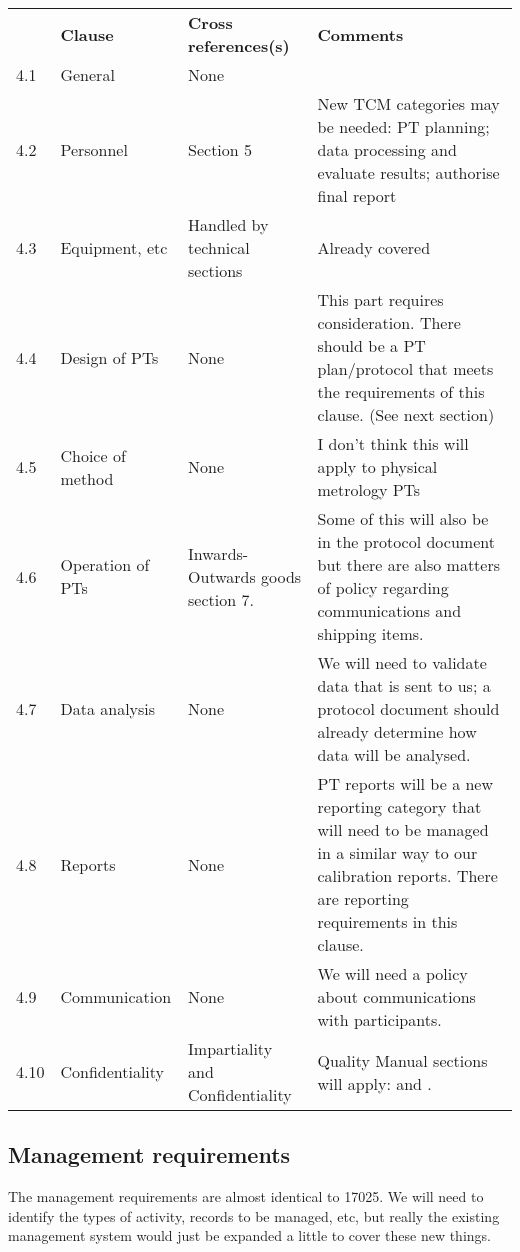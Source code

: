 \begin{center}
{\renewcommand*{\arraystretch}{1.4}
\begin{tabular}{p{1em}p{10em}p{12em}p{16em}}
	\rowcolor[rgb]{ 0,  0,  0} 
	\textcolor[rgb]{ 1,  1,  1}{} & 
	\textcolor[rgb]{ 1,  1,  1}{\textbf{Clause}} & 
	\textcolor[rgb]{ 1,  1,  1}{\textbf{Cross references(s)}} &
	\textcolor[rgb]{ 1,  1,  1}{\textbf{Comments}} \\
4.1 & General & None &   \\
4.2	& Personnel & Section 5 & 
New TCM categories may be needed: PT planning; data processing and evaluate results; authorise final report \\
4.3	& Equipment, etc & Handled by technical sections	& Already covered \\
4.4	& Design of PTs	& None	& This part requires consideration. There should be a PT plan/protocol that meets the requirements of this clause. (See next section) \\
4.5	& Choice of method	& None	& I don't think this will apply to physical metrology PTs \\
4.6	& Operation of PTs	& Inwards-Outwards goods section 7. & 
Some of this will also be in the protocol document but there are also matters of policy regarding communications and shipping items. \\
4.7	& Data analysis	& None	& We will need to validate data that is sent to us; a protocol document should already determine how data will be analysed.\\
4.8	& Reports	& None	& PT reports will be a new reporting category that will need to be managed in a similar way to our calibration reports. There are reporting requirements in this clause.\\
4.9	& Communication	& None	& We will need a policy about communications with participants.\\
4.10	& Confidentiality	& Impartiality and Confidentiality & Quality Manual sections will apply: \cite[\S\ref*{QM-sss:confidentiality}]{MSL_Quality_Manual} and \cite[\S\ref*{QM-sssp:impartiality}]{MSL_Quality_Manual}.

\end{tabular} } \end{center}

\subsection{Management requirements}
The management requirements are almost identical to 17025. We will need to identify the types of activity, records to be managed, etc, but really the existing management system would just be expanded a little to cover these new things.


